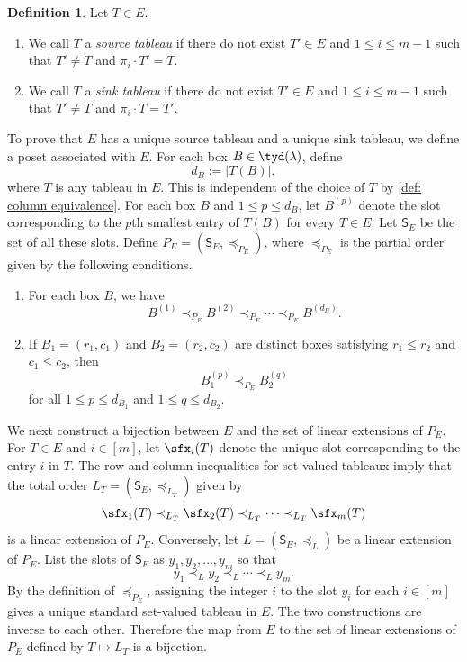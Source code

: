 \documentclass[12pt, reqno]{amsart}
\numberwithin{equation}{section}
\numberwithin{figure}{section}
\numberwithin{table}{section}
\theoremstyle{definition}
\newtheorem{definition}[theorem]{Definition}
\begin{document}
\begin{definition}\label{def: source sink}
Let $T \in E$.
\begin{enumerate}[label = {\rm (\arabic*)}]
\item 
We call $T$ a \emph{source tableau} if there do not exist $T' \in E$ and $1 \le i \le m-1$ such that $T' \ne T$ and $\pi_i \cdot T'=T$.
\item
We call $T$ a \emph{sink tableau} if there do not exist $T' \in E$ and $1 \le i \le m-1$ such that $T' \ne T$ and $\pi_i \cdot T=T'$.
\end{enumerate}
\end{definition}


To prove that $E$ has a unique source tableau and a unique sink tableau,
we define a poset associated with $E$.
For each box $B \in \tyd(\lambda)$, define
\[
d_B:=|T(B)|,
\]
where $T$ is any tableau in $E$.
This is independent of the choice of $T$ by \cref{def: column equivalence}.
For each box $B$ and $1 \le p \le d_B$, let $B^{(p)}$ denote the slot corresponding to the $p$th smallest entry of $T(B)$ for every $T \in E$. 
Let $\mathsf{S}_E$ be the set of all these slots.
Define $P_E=(\mathsf{S}_E,\preceq_{P_E})$, where $\preceq_{P_E}$ is the partial order given by the following conditions.
\begin{enumerate}[label = {\rm (\arabic*)}]
\item For each box $B$, we have
\[
B^{(1)}\prec_{P_E} B^{(2)}\prec_{P_E}\cdots\prec_{P_E} B^{(d_B)}.
\]
\item If $B_1=(r_1,c_1)$ and $B_2=(r_2,c_2)$ are distinct boxes satisfying $r_1\le r_2$ and $c_1\le c_2$, then
\[
B_1^{(p)}\prec_{P_E} B_2^{(q)}
\]
for all $1 \le p \le d_{B_1}$ and $1 \le q \le d_{B_2}$.
\end{enumerate}


We next construct a bijection between $E$ and the set of linear extensions of $P_E$.
For $T \in E$ and $i \in [m]$, let $\sfx_i(T)$ denote the unique slot corresponding to the entry $i$ in $T$.
The row and column inequalities for set-valued tableaux imply that the total order $L_T=(\mathsf{S}_E,\preceq_{L_T})$ given by
\[
\sfx_1(T)\prec_{L_T}\sfx_2(T)\prec_{L_T}\cdots\prec_{L_T}\sfx_m(T)
\]
is a linear extension of $P_E$.
Conversely, let $L=(\mathsf{S}_E,\preceq_L)$ be a linear extension of $P_E$.
List the slots of $\mathsf{S}_E$ as $y_1,y_2,\ldots,y_m$ so that
\[
y_1\prec_L y_2\prec_L\cdots\prec_L y_m.
\]
By the definition of $\preceq_{P_E}$, assigning the integer $i$ to the slot $y_i$ for each $i \in [m]$ gives a unique standard set-valued tableau in $E$.
The two constructions are inverse to each other.
Therefore the map from $E$ to the set of linear extensions of $P_E$ defined by $T\mapsto L_T$ is a bijection.
\end{document}
